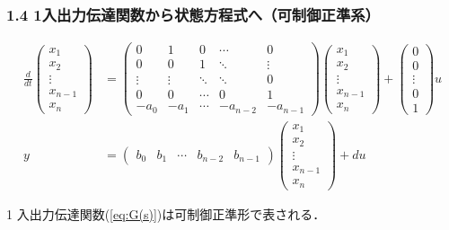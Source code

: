 \begin{frame}[t]
\frametitle{1.4 1入出力伝達関数から状態方程式へ{\small （可制御正準系）}}
\begin{align}
 \frac{d}{dt}
  \left(\begin{array}{c}
         x_1 \\
	 x_2 \\
	 \vdots \\
	 x_{n-1} \\
	 x_n
	\end{array}\right)
  &=
  \left(\begin{array}{ccccc}
     0      & 1      & 0      & \cdots & 0 \\
	 0      & 0      & 1      & \ddots & \vdots \\
	 \vdots & \vdots & \ddots & \ddots & 0 \\
	 0      & 0      & \cdots & 0      & 1 \\
	 -a_0   & -a_1   & \cdots & -a_{n-2} & -a_{n-1}
	\end{array}\right)
  \left(\begin{array}{c}
	 x_1 \\
	 x_2 \\
	 \vdots \\
	 x_{n-1} \\
	 x_n
	\end{array}\right)
  +
  \left(\begin{array}{c}
         0 \\
	 0 \\
	 \vdots \\
	 0 \\
	 1
	\end{array}\right)
  u \label{eq:canoform}\\
y &=
 \left(\begin{array}{ccccc}
        b_0 & b_1 & \cdots & b_{n-2} & b_{n-1}
       \end{array}\right)
 \left(\begin{array}{c}
        x_1 \\
	x_2 \\
	\vdots \\
	x_{n-1} \\
	x_n
       \end{array}\right)
 + d u
\end{align}

1 入出力伝達関数(\ref{eq:G(s)})は可制御正準形で表される．
\end{frame}

